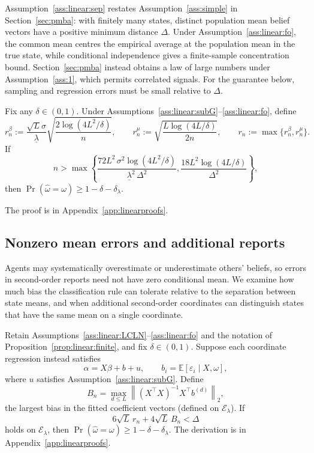 \documentclass[12pt,reqno]{amsart}
\begin{document}
Assumption~\ref{ass:linear:sep} restates Assumption~\ref{ass:simple} in Section~\ref{sec:pmba}: with finitely many states, distinct population mean belief vectors have a positive minimum distance $\Delta$. Under Assumption~\ref{ass:linear:fo}, the common mean centres the empirical average at the population mean in the true state, while conditional independence gives a finite-sample concentration bound. Section~\ref{sec:pmba} instead obtains a law of large numbers under Assumption~\ref{ass:1}, which permits correlated signals. For the guarantee below, sampling and regression errors must be small relative to $\Delta$.

\begin{proposition}\label{prop:linear:finite}
Fix any $\delta\in(0,1)$. Under
Assumptions~\ref{ass:linear:subG}--\ref{ass:linear:fo}, define
\[
r_n^\beta:=\frac{\sqrt{L}\sigma}{\underline\lambda}\sqrt{\frac{2\log(4L^2/\delta)}{n}},
\qquad
r_n^\mu:=\sqrt{\frac{L\log(4L/\delta)}{2n}},
\qquad
r_n:=\max\{r_n^\beta,r_n^\mu\}.
\]
If
\begin{equation}
  n>\max\!\left\{
  \frac{72L^2\,\sigma^2\log(4L^2/\delta)}{\underline\lambda^2\,\Delta^2},
  \frac{18L^2\log(4L/\delta)}{\Delta^2}
  \right\},
  \label{eq:n_threshold}
\end{equation}
then $\Pr(\widehat\omega = \omega) \ge 1-\delta{}-\delta_\lambda$.
\end{proposition}

The proof is in Appendix~\ref{app:linearproofs}.

\subsection{Nonzero mean errors and additional reports}

\label{sec:bias}
Agents may systematically overestimate or underestimate others' beliefs, so errors in second-order reports need not have zero conditional mean. We examine how much bias the classification rule can tolerate relative to the separation between state means, and when additional second-order coordinates can distinguish states that have the same mean on a single coordinate.

Retain
Assumptions~\ref{ass:linear:LCLN}--\ref{ass:linear:fo} and the notation of
Proposition~\ref{prop:linear:finite}, and fix $\delta\in(0,1)$. Suppose each
coordinate regression instead satisfies
\begin{equation*}
\alpha=X\beta+b+u,\qquad b_i=\mathbb{E}[\varepsilon_i\mid X,\omega],
\end{equation*}
where $u$ satisfies Assumption~\ref{ass:linear:subG}. %
Define
\begin{equation*}
B_n=\max_{d\leq L}\left\|(X^{\top}X)^{-1}X^{\top}b^{(d)}\right\|_2,
\end{equation*}
the largest bias in the fitted coefficient vectors (defined on $\mathcal{E}_\lambda$). If
\begin{equation}  \label{eq:biasmargin}
6\sqrt L\,r_n+4\sqrt L\,B_n<\Delta
\end{equation}
holds on $\mathcal{E}_\lambda$, then $\Pr(\widehat\omega=\omega)\geq1-\delta{}-\delta_\lambda$. The derivation is in Appendix~\ref{app:linearproofs}.
\end{document}
